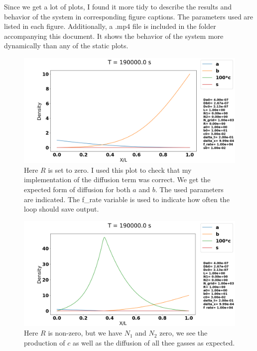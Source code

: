 \documentclass[1p]{elsarticle}        	%
\begin{document}
Since we get a lot of plots, I found it more tidy to describe the results and behavior of the system in corresponding figure captions.
The parameters used are listed in each figure. 
Additionally, a .mp4 file is included in the folder accompanying this document.
It shows the behavior of the system more dynamically than any of the static plots.

\begin{figure}
	\centering
	\includegraphics[width=\linewidth]{../figures/R0.png}
	\caption{Here $R$ is set to zero. I used this plot to check that my implementation of the diffusion term was correct. We get the expected form of diffusion for both $a$ and $b$. The used parameters are indicated. The f\_rate variable is used to indicate how often the loop should save output.}
	\label{fig:coords}
\end{figure}

\begin{figure}
	\centering
	\includegraphics[width=\linewidth]{../figures/N0.png}
	\caption{Here $R$ is non-zero, but we have $N_1$ and $N_2$ zero, we see the production of $c$ as well as the diffusion of all thee gasses as expected.}
	\label{fig:coords}
\end{figure}
\end{document}
